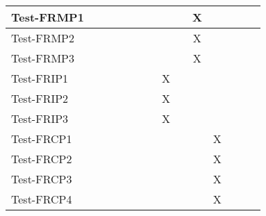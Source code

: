 \documentclass[12pt, titlepage]{article}
\begin{document}
\begin{table}[H]
\begin{adjustwidth}{-0.3in}{-0.5in}
{\begin{tabular}{c|c|c|c|c|c|c|c|c|c|c|c|c|c|}
\multicolumn{1}{|l|}{{Test-FRMP1}}   &             &             &             &             &             &             &                          &              &      X        &              &             &  &                    \\ \hline
\multicolumn{1}{|l|}{{Test-FRMP2}}   &             &             &             &             &             &             &                          &              &     X         &              &             &  &                    \\ \hline
\multicolumn{1}{|l|}{{Test-FRMP3}}   &             &             &             &             &             &             &                          &              &      X        &              &             &  &                    \\ \hline
\multicolumn{1}{|l|}{{Test-FRIP1}}   &             &             &             &             &             &             &        X                  &              &              &              &             &  &                    \\ \hline
\multicolumn{1}{|l|}{{Test-FRIP2}}   &             &             &             &             &             &             &          X                &              &              &              &             &  &                    \\ \hline
\multicolumn{1}{|l|}{{Test-FRIP3}}   &             &             &            &             &             &             &          X                &              &              &              &             &  &                    \\ \hline\multicolumn{1}{|l|}{{Test-FRCP1}}   &             &             &             &             &             &             &                          &              &              &   X           &             &  &                    \\ \hline
\multicolumn{1}{|l|}{{Test-FRCP2}}   &             &             &            &             &             &             &                          &              &              &         X     &             &  &                    \\ \hline
\multicolumn{1}{|l|}{{Test-FRCP3}}   &             &             &             &             &             &             &                          &              &              &     X         &             &  &                    \\ \hline
\multicolumn{1}{|l|}{{Test-FRCP4}}   &             &             &             &             &             &             &                          &              &              &     X         &             &  &                    \\ \hline

\end{tabular}}
\end{adjustwidth}
\end{table}
\end{document}
